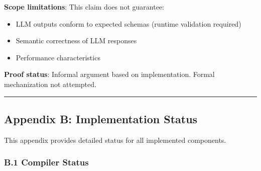 \documentclass[
]{article}
\providecommand{\tightlist}{%
  \setlength{\itemsep}{0pt}\setlength{\parskip}{0pt}}
\begin{document}
\textbf{Scope limitations}: This claim does not guarantee:

\begin{itemize}
\tightlist
\item
  LLM outputs conform to expected schemas (runtime validation required)
\item
  Semantic correctness of LLM responses
\item
  Performance characteristics
\end{itemize}

\textbf{Proof status}: Informal argument based on implementation. Formal
mechanization not attempted.

\begin{center}\rule{0.5\linewidth}{0.5pt}\end{center}

\subsection{Appendix B: Implementation
Status}\label{appendix-b-implementation-status}

This appendix provides detailed status for all implemented components.

\subsubsection{B.1 Compiler Status}\label{b.1-compiler-status}
\end{document}
